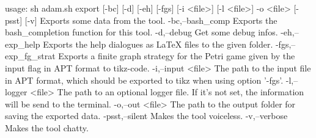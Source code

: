 usage: sh adam.sh export [-bc] [-d] [-eh] [-fgs] [-i <file>] [-l <file>] -o <file> [-psst]
       [-v]
Exports some data from the tool.
 -bc,--bash_comp       Exports the bash_completion function for this tool.
 -d,--debug            Get some debug infos.
 -eh,--exp_help        Exports the help dialogues as LaTeX files to the given folder.
 -fgs,--exp_fg_strat   Exports a finite graph strategy for the Petri game given by the input
                       flag in APT format to tikz-code.
 -i,--input <file>     The path to the input file in APT format, which should be exported to
                       tikz when using option '-fgs'.
 -l,--logger <file>    The path to an optional logger file. If it's not set, the information
                       will be send to the terminal.
 -o,--out <file>       The path to the output folder for saving the exported data.
 -psst,--silent        Makes the tool voiceless.
 -v,--verbose          Makes the tool chatty.
